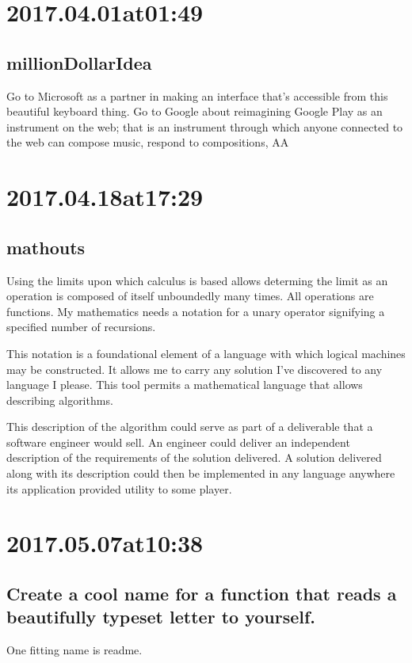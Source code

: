 \begin{enumerate}
\begin{enumerate}
\section*{ 2017.04.01at01:49 }
\subsection*{ millionDollarIdea }
Go to Microsoft as a partner in making an interface that's accessible from this beautiful keyboard thing.
Go to Google about reimagining Google Play as an instrument on the web;
that is an instrument through which anyone connected to the web can compose music, respond to compositions, AA

\section*{ 2017.04.18at17:29 }
\subsection*{ mathouts }
Using the limits upon which calculus is based allows determing the limit as an operation is composed of itself unboundedly many times.
All operations are functions.
My mathematics needs a notation for a unary operator signifying a specified number of recursions.

This notation is a foundational element of a language with which logical machines may be constructed.
It allows me to carry any solution I've discovered to any language I please.
This tool permits a mathematical language that allows describing algorithms.

This description of the algorithm could serve as part of a deliverable that a software engineer would sell.
An engineer could deliver an independent description of the requirements of the solution delivered.
A solution delivered along with its description could then be implemented in any language anywhere its application provided utility to some player.

\section*{ 2017.05.07at10:38 }
\subsection*{ Create a cool name for a function that reads a beautifully typeset letter to yourself. }
One fitting name is readme.


\end{enumerate}
\end{enumerate}
